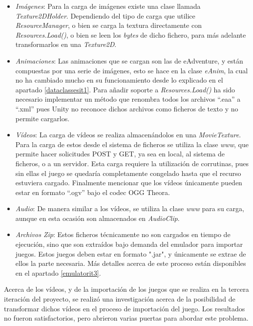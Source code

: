 \begin{itemize}
	\item \textit{Imágenes}: Para la carga de imágenes existe una clase llamada \textit{Texture2DHolder}. Dependiendo del tipo de carga que utilice \textit{ResourceManager}, o bien se carga la textura directamente con \textit{Resources.Load()}, o bien se leen los \textit{bytes} de dicho fichero, para más adelante transformarlos en una \textit{Texture2D}.
	
	\item \textit{Animaciones}: Las animaciones que se cargan son las de eAdventure, y están compuestas por una serie de imágenes, esto se hace en la clase \textit{eAnim}, la cual no ha cambiado mucho en su funcionamiento desde lo explicado en el apartado \ref{dataclassesit1}. Para añadir soporte a \textit{Resources.Load()} ha sido necesario implementar un método que renombra todos los archivos ``.eaa'' a ``.xml'' pues Unity no reconoce dichos archivos como ficheros de texto y no permite cargarlos.
	
	\item \textit{Vídeos}: La carga de vídeos se realiza almacenándolos en una \textit{MovieTexture}. Para la carga de estos desde el sistema de ficheros se utiliza la clase \textit{www}, que permite hacer solicitudes POST y GET, ya sea en local, al sistema de ficheros, o a un servidor. Esta carga requiere la utilización de corrutinas, pues sin ellas el juego se quedaría completamente congelado hasta que el recurso estuviera cargado. Finalmente mencionar que los vídeos únicamente pueden estar en formato ``.ogv'' bajo el codec OGG Theora.
	
	\item \textit{Audio}: De manera similar a los vídeos, se utiliza la clase \textit{www} para su carga, aunque en esta ocasión son almacenados en \textit{AudioClip}.
	
	\item \textit{Archivos Zip}: Estos ficheros técnicamente no son cargados en tiempo de ejecución, sino que son extraídos bajo demanda del emulador para importar juegos. Estos juegos deben estar en formato ".jar", y únicamente se extrae de ellos la parte necesaria. Más detalles acerca de este proceso están disponibles en el apartado \ref{emulatorit3}.
\end{itemize}

Acerca de los vídeos, y de la importación de los juegos que se realiza en la tercera iteración del proyecto, se realizó una investigación acerca de la posibilidad de transformar dichos vídeos en el proceso de importación del juego. Los resultados no fueron satisfactorios, pero abrieron varias puertas para abordar este problema.


